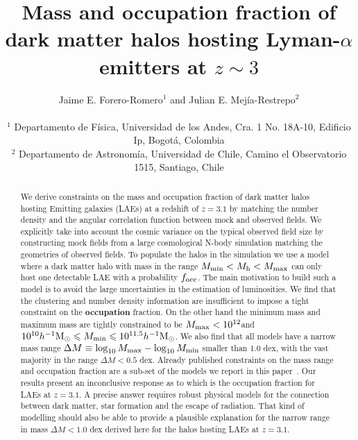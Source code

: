 \documentclass[usenatbib]{mn2e}
\newcommand{\documentname}{paper~}
\newcommand{\ly}{{\ifmmode{{\rm Ly}\alpha}\else{Ly$\alpha$~}\fi}}
\newcommand{\hMsun}{{\ifmmode{h^{-1}{\rm
        {M_{\odot}}}}\else{$h^{-1}{\rm{M_{\odot}}}$}\fi}}
\begin{document}
\title[Halo mass and occupation fraction of LAEs at$z=3.1$]{Mass and
  occupation fraction of dark matter halos hosting Lyman-$\alpha$
  emitters at $z\sim 3$}      
\author[~J.~E. Forero-Romero and ~J.~E. Mejia-Restreo]{
\parbox[t]{\textwidth}{\raggedright 
  Jaime E. Forero-Romero$^{1}$ and
  Julian E. Mej\'ia-Restrepo$^{2}$ 
}
\vspace*{6pt}\\
$^{1}$ Departamento de F\'{i}sica, Universidad de los Andes, Cra. 1
No. 18A-10, Edificio Ip, Bogot\'a, Colombia \\
$^{2}$ Departamento de Astronom\'{i}a, Universidad de Chile, Camino el
Observatorio 1515, Santiago, Chile} 

\maketitle

\begin{abstract}
%
We derive constraints on the mass and occupation fraction of dark
matter halos hosting \ly Emitting galaxies (LAEs) at a redshift of
$z=3.1$ by matching the number density and the angular
correlation function between mock and observed fields. We explicitly
take into account the cosmic variance on the typical observed field size by
constructing mock fields from a large cosmological N-body
simulation matching the geometries of observed fields. To populate the
halos in the simulation we use a model where a dark matter halo with
mass in the range $M_{\rm   min}<M_{\rm h}<M_{\rm max}$ can only host
one detectable LAE with a probability $f_{\rm occ}$. The main motivation to
build such a model is to avoid the large uncertainties in the estimation of
\ly luminosities. We find that the clustering and number density information are
insufficient to impose a tight constraint on the {\bf occupation} fraction. On
the other hand the minimum mass and maximum mass are tightly
constrained to be $M_{\rm max}<10^{12}$\hMsun and
$10^{10}\hMsun\leq M_{\rm min}\leq 10^{11.5}\hMsun$.  We also find
that all models have a narrow mass range $\Delta M \equiv
\log_{10}M_{\rm max} - \log_{10} M_{\rm min}$ smaller than $1.0$ dex,
with the vast majority in the range $\Delta M<0.5$ dex. Already
published constraints on the mass range and occupation fraction are a sub-set of
the models we report in this \documentname. Our results present an
inconclusive response as to which is the occupation fraction for LAEs
at $z=3.1$. A precise answer requires robust physical models for the
connection between dark matter, star formation and the escape of \ly
radiation. That kind of modelling should also be able to provide a
plausible explanation for the narrow range in mass $\Delta M<1.0$ dex
derived here for the halos hosting LAEs at $z=3.1$.   

\end{abstract}
\end{document}
